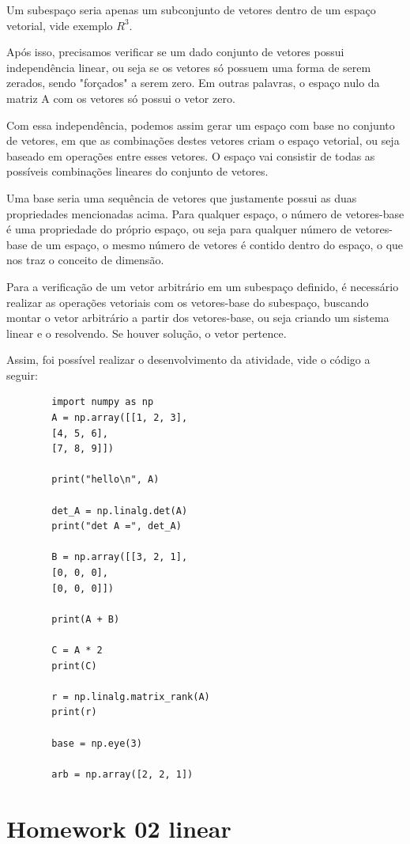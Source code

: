 	Um subespaço seria apenas um subconjunto de vetores dentro de um espaço vetorial, vide exemplo $R^3$.
	
	Após isso, precisamos verificar se um dado conjunto de vetores possui independência linear, ou seja se os vetores só possuem uma forma de serem zerados, sendo "forçados" a serem zero. Em outras palavras, o espaço nulo da matriz A com os vetores só possui o vetor zero.
	
	Com essa independência, podemos assim gerar um espaço com base no conjunto de vetores, em que as combinações destes vetores criam o espaço vetorial, ou seja baseado em operações entre esses vetores. O espaço vai consistir de todas as possíveis combinações lineares do conjunto de vetores. 
	
	Uma base seria uma sequência de vetores que justamente possui as duas propriedades mencionadas acima. Para qualquer espaço, o número de vetores-base é uma propriedade do próprio espaço, ou seja para qualquer número de vetores-base de um espaço, o mesmo número de vetores é contido dentro do espaço, o que nos traz o conceito de dimensão. 
	
	Para a verificação de um vetor arbitrário em um subespaço definido, é necessário realizar as operações vetoriais com os vetores-base do subespaço, buscando montar o vetor arbitrário a partir dos vetores-base, ou seja criando um sistema linear e o resolvendo. Se houver solução, o vetor pertence. 
	
	Assim, foi possível realizar o desenvolvimento da atividade, vide o código a seguir: 
	
	\begin{lstlisting}
		import numpy as np
		A = np.array([[1, 2, 3],
		[4, 5, 6],
		[7, 8, 9]])
		
		print("hello\n", A)
		
		det_A = np.linalg.det(A)
		print("det A =", det_A)
		
		B = np.array([[3, 2, 1],
		[0, 0, 0],
		[0, 0, 0]])
		
		print(A + B)
		
		C = A * 2
		print(C)
		
		r = np.linalg.matrix_rank(A)
		print(r)
		
		base = np.eye(3)
		
		arb = np.array([2, 2, 1])
	\end{lstlisting}
	
	\section{Homework 02 linear}
	
